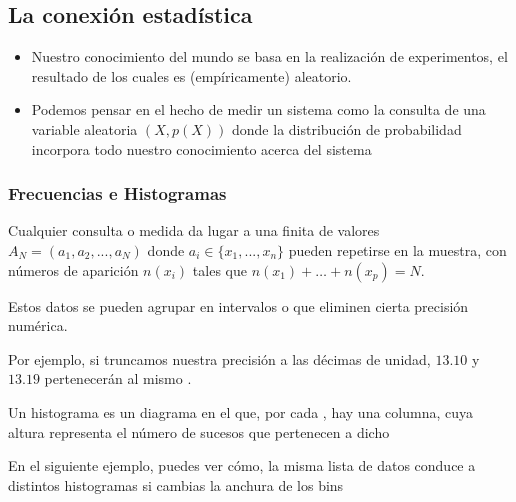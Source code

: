 \documentclass[letterpaper,10pt,english]{jupyterBook}
\begin{document}
\subsection{La conexión estadística}
\label{\detokenize{docs/Part_01_Formalismo/Chapter_01_02_Formalismo_matem_xe1tico/01_05_Probabilidades_myst:la-conexion-estadistica}}\begin{itemize}
\item {} 
\sphinxAtStartPar
Nuestro conocimiento del mundo se basa en la realización de experimentos, el resultado de los cuales es (empíricamente) aleatorio.

\end{itemize}
\begin{itemize}
\item {} 
\sphinxAtStartPar
Podemos pensar en el hecho de medir un sistema como la consulta de una variable aleatoria \((X,p(X))\) donde la distribución de probabilidad incorpora todo nuestro conocimiento acerca del sistema

\end{itemize}


\subsubsection{Frecuencias e Histogramas}
\label{\detokenize{docs/Part_01_Formalismo/Chapter_01_02_Formalismo_matem_xe1tico/01_05_Probabilidades_myst:frecuencias-e-histogramas}}
\sphinxAtStartPar
Cualquier consulta o medida da lugar a una  finita de valores \(A_N = (a_1,a_2,...,a_N)\) donde \(a_i\in \{x_1,...,x_n\}\) pueden repetirse en la muestra, con números de aparición \(n(x_i)\) tales que  \(n(x_1) +  \ldots + n(x_p) = N\).

\sphinxAtStartPar
Estos datos se pueden agrupar en intervalos o  que eliminen cierta precisión numérica.

\sphinxAtStartPar
Por ejemplo, si truncamos nuestra precisión a las décimas de unidad,  \(13.10\) y \(13.19\) pertenecerán al mismo .

\sphinxAtStartPar
Un histograma es un diagrama en el que, por cada , hay una columna, cuya altura representa el número de sucesos que pertenecen a dicho 

\sphinxAtStartPar
En el siguiente ejemplo, puedes ver cómo, la misma lista de datos conduce a distintos histogramas si cambias la anchura de los bins
\end{document}
